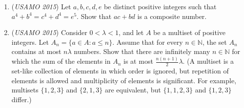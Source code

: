 \begin{enumerate}
 How many different non-equivalent ways can Steve pile the stones on the grid?


 

	\item (\textit{USAMO 2015}) Let $a, b, c, d, e$ be distinct positive integers such that $a^4 + b^4 = c^4 + d^4 = e^5$. Show that $ac + bd$ is a composite number.


 

	\item (\textit{USAMO 2015}) Consider $0<\lambda<1$, and let $A$ be a multiset of positive integers. Let $A_n=\{a\in A: a\leq n\}$. Assume that for every $n\in\mathbb{N}$, the set $A_n$ contains at most $n\lambda$ numbers. Show that there are infinitely many $n\in\mathbb{N}$ for which the sum of the elements in $A_n$ is at most $\frac{n(n+1)}{2}\lambda$. (A multiset is a set-like collection of elements in which order is ignored, but repetition of elements is allowed and multiplicity of elements is significant. For example, multisets $\{1, 2, 3\}$ and $\{2, 1, 3\}$ are equivalent, but $\{1, 1, 2, 3\}$ and $\{1, 2, 3\}$ differ.)


 

\end{enumerate}